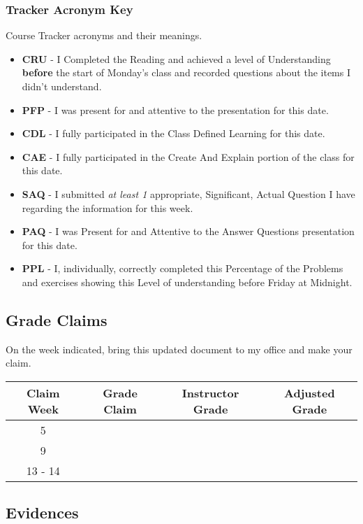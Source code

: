 \documentclass[12pt]{amsart}
\begin{document}
\subsubsection{Tracker Acronym Key} Course Tracker acronyms and their meanings.
\begin{itemize}
	\item \textbf{CRU} - I Completed the Reading and achieved a level of Understanding \textbf{before} the start of Monday's class and recorded questions about the items I didn't understand.
	\item \textbf{PFP} - I was present for and attentive to the presentation for this date.
	\item \textbf{CDL} - I fully participated in the Class Defined Learning for this date.
	\item \textbf{CAE} - I fully participated in the Create And Explain portion of the class for this date.
	\item \textbf{SAQ} - I submitted \textit{at least 1} appropriate, Significant, Actual Question I have regarding the information for this week.
	\item \textbf{PAQ} - I was Present for and Attentive to the Answer Questions presentation for this date.
	\item \textbf{PPL} - I, individually, correctly completed this Percentage of the Problems and exercises showing  this Level of understanding before Friday at Midnight.
\end{itemize}
\subsection{Grade Claims} On the week indicated, bring this updated document to my office and make your claim.
\begin{table}[ht]
\begin{center}
\begin{tabular}{|c|c|c|c|}
	\hline
   \rowcolor[gray]{.9}
	Claim Week & Grade Claim & Instructor Grade & Adjusted Grade \\
	\hline
	 5 & & & \\
	\hline
	 9 & & & \\
	\hline
	13 - 14 & & &\\
	\hline
\end{tabular}
\end{center}
\end{table}

\newpage


\subsection{Evidences}
\end{document}
